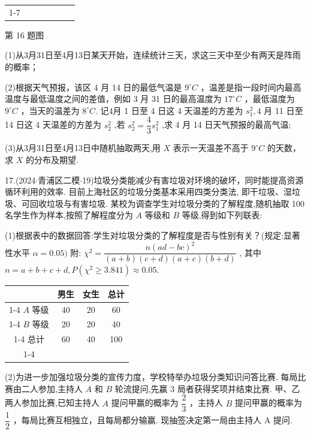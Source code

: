 \begin{center}
\begin{tabular}{|c|c|c|c|c|c|c|}
\cline{1-7}
\hline
\end{tabular}
\end{center}

第 16 题图

(1)从3月31日至4月13日某天开始，连续统计三天，求这三天中至少有两天是阵雨的概率；

(2)根据天气预报，该区 4 月 14 日的最低气温是 ${9}^{ \circ  }{C}$ ，温差是指一段时间内最高温度与最低温度之间的差值，例如 3 月 31 日的最高温度为 ${17}^{ \circ  }{C}$ ，最低温度为 ${9}^{ \circ  }{C}$ ，当天的温差为 ${8}^{ \circ  }{C}$. 记4月 1 日至 4 日这 4 天温差的方差为 ${s}_{1}^{2},4$ 月 11 日至 14 日这 4 天温差的方差为 ${s}_{2}^{2}$ ,若 ${s}_{2}^{2} = \dfrac{4}{3}{s}_{1}^{2}$ ,求 4 月 14 日天气预报的最高气温;

(3)从3月31日至4月13日中随机抽取两天,用 $X$ 表示一天温差不高于 ${9}^{ \circ  }{C}$ 的天数，求 $X$ 的分布及期望.

17.(2024$\cdot$青浦区二模$\cdot$19)垃圾分类能减少有害垃圾对环境的破坏，同时能提高资源循环利用的效率. 目前上海社区的垃圾分类基本采用四类分类法, 即干垃圾、湿垃圾、可回收垃圾与有害垃圾. 某校为调查学生对垃圾分类的了解程度,随机抽取 100 名学生作为样本,按照了解程度分为 $A$ 等级和 $B$ 等级,得到如下列联表:

(1)根据表中的数据回答:学生对垃圾分类的了解程度是否与性别有关？(规定:显著性水平 $\alpha  = {0.05})$ 附: ${\chi }^{2} = \dfrac{n{\left( ad - bc\right) }^{2}}{\left( {a + b}\right) \left( {c + d}\right) \left( {a + c}\right) \left( {b + d}\right) }$ , 其中 $n = a + b + c + d,P\left( {{\chi }^{2} \geq  {3.841}}\right)  \approx  {0.05}$.

\begin{center}

\begin{tabular}{|c|c|c|c|}
\hline
\phantom{X} & 男生 & 女生 & 总计 \\
\cline{1-4}
$A$ 等级 & 40 & 20 & 60 \\
\cline{1-4}
$B$ 等级 & 20 & 20 & 40 \\
\cline{1-4}
总计 & 60 & 40 & 100 \\
\cline{1-4}
\hline
\end{tabular}
\end{center}

(2)为进一步加强垃圾分类的宣传力度，学校特举办垃圾分类知识问答比赛. 每局比赛由二人参加,主持人 $A$ 和 $B$ 轮流提问,先赢 3 局者获得奖项并结束比赛. 甲、乙两人参加比赛,已知主持人 $A$ 提问甲赢的概率为 $\dfrac{2}{3}$ ，主持人 $B$ 提问甲赢的概率为 $\dfrac{1}{2}$ ，每局比赛互相独立，且每局都分输赢. 现抽签决定第一局由主持人 A 提问.


